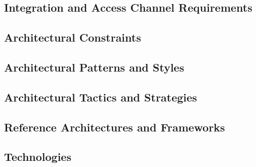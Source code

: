 \documentclass[11pt]{article}
\begin{document}
	\subsection{Integration and Access Channel Requirements}
		
	
	\newpage
	
	\subsection{Architectural Constraints}
		
	
	\newpage
	
	\subsection{Architectural Patterns and Styles}
		
	
	\subsection{Architectural Tactics and Strategies}
		
	
	\newpage
	
	\subsection{Reference Architectures and Frameworks}
		
	
	\subsection{Technologies}
		
	
\end{document}
